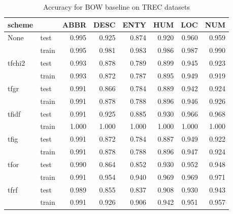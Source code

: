\begin{table}[H]
\begin{center}

\begin{tabular}{llrrrrrr}
\toprule
scheme &&  ABBR &  DESC &  ENTY &  HUM &  LOC &  NUM \\
\midrule
None & test & 0.995 & 0.925 & 0.874 &0.920 &0.960 &0.959 \\
{} & train & 0.995 & 0.981 & 0.983 &0.986 &0.987 &0.990 \\
tfchi2 & test & 0.993 & 0.878 & 0.789 &0.899 &0.945 &0.923 \\
{} & train & 0.993 & 0.872 & 0.787 &0.895 &0.949 &0.919 \\
tfgr & test & 0.991 & 0.866 & 0.784 &0.889 &0.942 &0.924 \\
{} & train & 0.991 & 0.878 & 0.788 &0.896 &0.946 &0.926 \\
tfidf & test & 0.991 & 0.925 & 0.885 &0.930 &0.966 &0.968 \\
{} & train & 1.000 & 1.000 & 1.000 &1.000 &1.000 &1.000 \\
tfig & test & 0.991 & 0.872 & 0.784 &0.887 &0.949 &0.922 \\
{} & train & 0.991 & 0.878 & 0.788 &0.896 &0.947 &0.924 \\
tfor & test & 0.990 & 0.864 & 0.852 &0.930 &0.952 &0.948 \\
{} & train & 0.991 & 0.954 & 0.940 &0.969 &0.969 &0.971 \\
tfrf & test & 0.989 & 0.855 & 0.837 &0.908 &0.930 &0.943 \\
{} & train & 0.991 & 0.926 & 0.906 &0.942 &0.951 &0.957 \\
\bottomrule
\end{tabular}

\caption[Accuracy for BOW baseline on TREC datasets]{Accuracy for BOW baseline on TREC datasets}
\label{results:bow:abs:trec}
\end{center}
\end{table}



